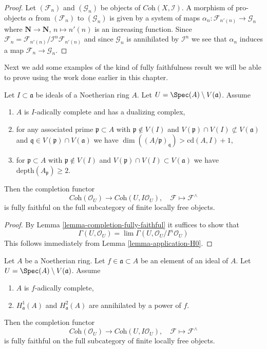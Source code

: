 \begin{proof}
Let $(\mathcal{F}_n)$ and $(\mathcal{G}_n)$ be objects of
$\textit{Coh}(X, \mathcal{I})$. A morphism of pro-objects
$\alpha$ from $(\mathcal{F}_n)$ to $(\mathcal{G}_n)$ is given
by a system of maps
$\alpha_n : \mathcal{F}_{n'(n)} \to \mathcal{G}_n$
where $\mathbf{N} \to \mathbf{N}$, $n \mapsto n'(n)$
is an increasing function. Since
$\mathcal{F}_n = \mathcal{F}_{n'(n)}/\mathcal{I}^n\mathcal{F}_{n'(n)}$
and since $\mathcal{G}_n$ is annihilated by $\mathcal{I}^n$
we see that $\alpha_n$ induces a map $\mathcal{F}_n \to \mathcal{G}_n$.
\end{proof}

\noindent
Next we add some examples of the kind of fully faithfulness
result we will be able to prove using the work done earlier in this chapter.

\begin{lemma}
\label{lemma-fully-faithful}
Let $I \subset \mathfrak a$ be ideals of a Noetherian ring $A$.
Let $U = \Spec(A) \setminus V(\mathfrak a)$. Assume
\begin{enumerate}
\item $A$ is $I$-adically complete and has a dualizing complex,
\item for any associated prime $\mathfrak p \subset A$ with
$\mathfrak p \not \in V(I)$ and
$V(\mathfrak p) \cap V(I) \not \subset V(\mathfrak a)$ and
$\mathfrak q \in V(\mathfrak p) \cap V(\mathfrak a)$ we have
$\dim((A/\mathfrak p)_\mathfrak q) > \text{cd}(A, I) + 1$,
\item for $\mathfrak p \subset A$ with $\mathfrak p \not \in V(I)$
and $V(\mathfrak p) \cap V(I) \subset V(\mathfrak a)$
we have $\text{depth}(A_\mathfrak p) \geq 2$.
\end{enumerate}
Then the completion functor
$$
\textit{Coh}(\mathcal{O}_U)
\longrightarrow
\textit{Coh}(U, I\mathcal{O}_U),
\quad
\mathcal{F} \longmapsto \mathcal{F}^\wedge
$$
is fully faithful on the full subcategory of
finite locally free objects.
\end{lemma}

\begin{proof}
By Lemma \ref{lemma-completion-fully-faithful}
it suffices to show that
$$
\Gamma(U, \mathcal{O}_U) =
\lim \Gamma(U, \mathcal{O}_U/I^n\mathcal{O}_U)
$$
This follows immediately from
Lemma \ref{lemma-application-H0}.
\end{proof}

\begin{lemma}
\label{lemma-fully-faithful-alternative}
Let $A$ be a Noetherian ring. Let $f \in \mathfrak a \subset A$
be an element of an ideal of $A$. Let $U = \Spec(A) \setminus V(\mathfrak a)$.
Assume
\begin{enumerate}
\item $A$ is $f$-adically complete,
\item $H^1_\mathfrak a(A)$ and $H^2_\mathfrak a(A)$ are
annihilated by a power of $f$.
\end{enumerate}
Then the completion functor
$$
\textit{Coh}(\mathcal{O}_U)
\longrightarrow
\textit{Coh}(U, I\mathcal{O}_U),
\quad
\mathcal{F} \longmapsto \mathcal{F}^\wedge
$$
is fully faithful on the full subcategory of
finite locally free objects.
\end{lemma}

